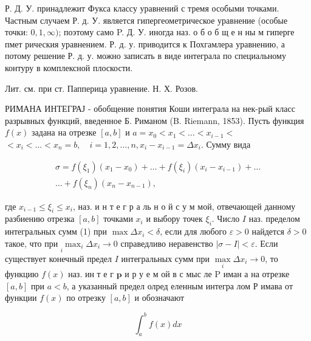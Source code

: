 \documentclass[10pt]{article}
\begin{document}
Р. Д. У. принадлежит Фукса классу уравнений с тремя особыми точками. Частным случаем Р. д. У. является гипергеометрическое уравнение (особые точки: $0,1, \infty)$; поэтому само P. Д. У. иногда наз. о б о б щ е н ны м гиперге пмет рическия уравнением. Р. д. у. приводится к Похгамлера уравнению, а потому решение Р. д. у. можно записать в виде интеграла по специальному контуру в комплексной плоскости.



Лит. см. при ст. Папперица уравнение. Н. Х. Розов.



РИМАНА ИНТЕГРАЈ - обобщение понятия Коши интеграла на нек-рый класс разрывных функций, введенное Б. Риманом (B. Riemann, 1853). Пусть функция $f(x)$ задана на отрезке $[a, b]$ и $a=x_{0}<x_{1}<\ldots<x_{i-1}<$ $<x_{i}<\ldots<x_{n}=b, \quad i=1,2, \ldots, n, x_{i}-x_{i-1}=\Delta x_{i}$. Сумму вида



\[

\begin{gathered}

\sigma=f\left(\xi_{1}\right)\left(x_{1}-x_{0}\right)+\ldots+f\left(\xi_{i}\right)\left(x_{i}-x_{i-1}\right)+\ldots \\

\ldots+f\left(\xi_{n}\right)\left(x_{n}-x_{n-1}\right),

\end{gathered}

\]



где $x_{i-1} \leqslant \xi_{i} \leqslant x_{i}$, наз. и н т е г р а ль н о й с у м мой, отвечающей данному разбиению отрезка $[a, b]$ точками $x_{i}$ и выбору точек $\xi_{i}$. Число $I$ наз. пределом интегральных сумм (1) при $\max \Delta x_{i}<\delta$, если для любого $\varepsilon>0$ найдется $\delta>0$ такое, что при $\underset{i}{ } \max _{i} \Delta x_{i} \rightarrow 0$ справедливо неравенство $|\sigma-I|<\varepsilon$. Если существует конечный предел $I$ интегральных сумм при $\underset{i}{\max } \Delta x_{i} \rightarrow 0$, то функцию $f(x)$ наз. ин т е г $\mathbf{p}$ и р у е м ой в с мыс ле $\mathrm{P}$ иман а на отрезке $[a, b]$ при $a<b$, а указанный предел олред еленным интегра лом Р имава от функции $f(x)$ по отрезку $[a, b]$ и обозначают



\[

\int_{a}^{b} f(x) d x

\]
\end{document}
